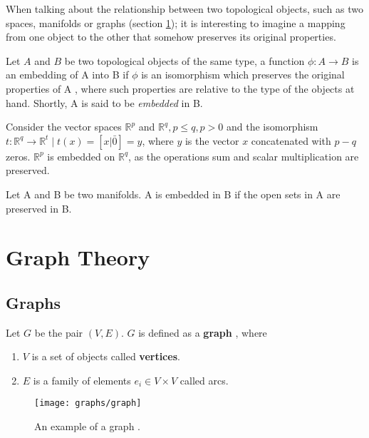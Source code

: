 When talking about the relationship between two topological objects, such as two spaces, manifolds or graphs (section \ref{sec:graphs}); it is interesting to imagine a mapping from one object to the other that somehow preserves its original properties.

Let $A$ and $B$ be two topological objects of the same type, a function $\phi \colon A \to B$ is an embedding of A into B if $\phi$ is an isomorphism which preserves the original properties of A \cite{burris2011course}, where such properties are relative to the type of the objects at hand. Shortly, A is said to be \textit{embedded} in B.

\begin{example}
	Consider the vector spaces $\mathbb{R}^p$ and $\mathbb{R}^q, p \leq q, p > 0$ and the isomorphism $t \colon \mathbb{R}^q \to \mathbb{R}^t \mid t(x) = [x | \bar{0}] = y$, where $y$ is the vector $x$ concatenated with $p-q$ zeros. $\mathbb{R}^p$ is embedded on $\mathbb{R}^q$, as the operations sum and scalar multiplication are preserved.
\end{example}

\begin{example}
	Let A and B be two manifolds. A is embedded in B if the open sets in A are preserved in B.
\end{example}


\section{Graph Theory}
\label{sec:graphs}
\subsection{Graphs}

Let $G$ be the pair $(V, E)$. $G$ is defined as a \textbf{graph} \cite{berge1973}, where
\begin{enumerate}
	\item $V$ is a set of objects called \textbf{vertices}.
	\item $E$ is a family of elements $e_i \in V\times V$ called arcs.
\end{enumerate}

\begin{figure}[H]
	\centering
	\texttt{[image: graphs/graph]}
	\caption{An example of a graph \protect\footnotemark.}
\end{figure}


